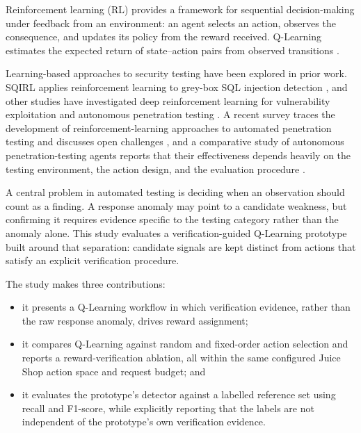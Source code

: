 \documentclass[conference, a4paper]{IEEEtran}
\begin{document}
Reinforcement learning (RL) provides a framework for sequential
decision-making under feedback from an environment: an agent
selects an action, observes the consequence, and updates its
policy from the reward received. Q-Learning estimates the
expected return of state--action pairs from observed transitions
\cite{sutton2018}.

Learning-based approaches to security testing have been explored
in prior work. SQIRL applies reinforcement learning to grey-box
SQL injection detection \cite{sqirl2023}, and other studies have
investigated deep reinforcement learning for vulnerability
exploitation and autonomous penetration testing
\cite{almajali2024,li2025}. A recent survey traces the development
of reinforcement-learning approaches to automated penetration
testing and discusses open challenges \cite{rlreview2026}, and a
comparative study of autonomous penetration-testing agents reports
that their effectiveness depends heavily on the testing
environment, the action design, and the evaluation procedure
\cite{sok2024}.

A central problem in automated testing is deciding when an
observation should count as a finding. A response anomaly may
point to a candidate weakness, but confirming it requires evidence
specific to the testing category rather than the anomaly alone.
This study evaluates a verification-guided Q-Learning prototype
built around that separation: candidate signals are kept distinct
from actions that satisfy an explicit verification procedure.

The study makes three contributions:

\begin{itemize}
    \item it presents a Q-Learning workflow in which verification
    evidence, rather than the raw response anomaly, drives reward
    assignment;

    \item it compares Q-Learning against random and fixed-order
    action selection and reports a reward-verification ablation,
    all within the same configured Juice Shop action space and
    request budget; and

    \item it evaluates the prototype's detector against a labelled
    reference set using recall and F1-score, while explicitly
    reporting that the labels are not independent of the
    prototype's own verification evidence.
\end{itemize}
\end{document}

